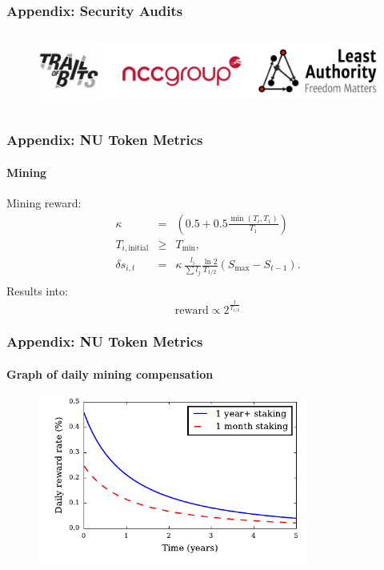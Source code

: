\documentclass[xetex,mathsans,sans,aspectratio=169]{beamer}
\begin{document}
    \begin{frame}
        \frametitle{Appendix: Security Audits}
        \begin{figure}
            \centering
            \includegraphics[height=2.5cm]{pdf/security-audits.pdf}
      \end{figure}
    \end{frame}

    \begin{frame}
        \frametitle{Appendix: NU Token Metrics}
        \framesubtitle{Mining}
        Mining reward:
        \begin{eqnarray}
            \kappa &=& \left(0.5 + 0.5\frac{\min(T_i, T_1)}{T_1}\right)\\
            T_{i,\text{initial}} &\ge& T_{\min},\\
            \delta s_{i,t} &=&  \kappa\, \frac{l_i}{\sum l_j} \frac{\ln{2}}{T_{1/2}} \left( S_{\max} - S_{t-1}\right).\\
        \end{eqnarray}
        Results into:
        $$\text{reward} \propto 2^{\frac{t}{T_{1/2}}}$$
    \end{frame}

    \begin{frame}
        \frametitle{Appendix: NU Token Metrics}
        \framesubtitle{Graph of daily mining compensation}
        \begin{figure}
            \centering
            \includegraphics[height=5.5cm]{pdf/daily-compensation.pdf}
        \end{figure}
    \end{frame}
\end{document}
